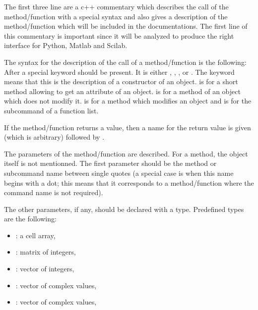 \documentclass[a4paper,11pt,english]{sphinxmanual}
\begin{document}
\begin{itemize}
The first three line are a c++ commentary which describes the call of the
method/function with a special syntax and also gives a description of the
method/function which will be included in the documentations. The first
line of this commentary is important since it will be analyzed to produce
the right interface for Python, Matlab and Scilab.

The syntax for the description of the call of a method/function is the
following: After  a special keyword should be present. It is either
, , ,  or . The keyword
 means that
this is the description of a constructor of an object.  is for
a short method allowing to get an attribute of an object.  is for a
method of an object which does not modify it.  is for a method which
modifies an object and  is for the sub\sphinxhyphen{}command of a function list.

If the method/function returns a value, then a name for the return value
is given (which is arbitrary) followed by \sphinxcode{\sphinxupquote{=}}.

The parameters of the method/function are described. For a method, the
object itself is not mentionned. The first parameter should be the method
or sub\sphinxhyphen{}command name between single quotes (a special case is when
this name begins with a dot; this means that it corresponds to a
method/function where the command name is not required).

The other parameters, if any, should be declared with a type. Predefined
types are the following:
\begin{itemize}
\item {} 
   : a cell array,

\item {} 
   : matrix of integers,

\item {} 
   : vector of integers,

\item {} 
   : vector of complex values,

\item {} 
  : vector of complex values,


\end{itemize}
\end{itemize}
\end{document}
